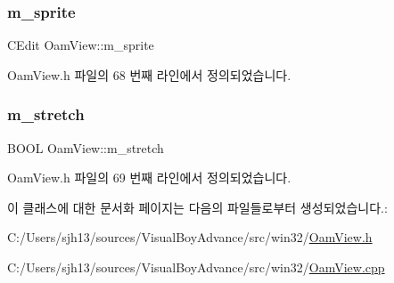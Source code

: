 \subsubsection{\texorpdfstring{m\+\_\+sprite}{m\_sprite}}
{\footnotesize\ttfamily C\+Edit Oam\+View\+::m\+\_\+sprite}



Oam\+View.\+h 파일의 68 번째 라인에서 정의되었습니다.

\mbox{\label{class_oam_view_a0eeb8a1eeda8d53816c2696d70d61da4}} 
\subsubsection{\texorpdfstring{m\+\_\+stretch}{m\_stretch}}
{\footnotesize\ttfamily B\+O\+OL Oam\+View\+::m\+\_\+stretch}



Oam\+View.\+h 파일의 69 번째 라인에서 정의되었습니다.



이 클래스에 대한 문서화 페이지는 다음의 파일들로부터 생성되었습니다.\+:\begin{DoxyCompactItemize}
\item 
C\+:/\+Users/sjh13/sources/\+Visual\+Boy\+Advance/src/win32/\mbox{\hyperlink{_oam_view_8h}{Oam\+View.\+h}}\item 
C\+:/\+Users/sjh13/sources/\+Visual\+Boy\+Advance/src/win32/\mbox{\hyperlink{_oam_view_8cpp}{Oam\+View.\+cpp}}\end{DoxyCompactItemize}
